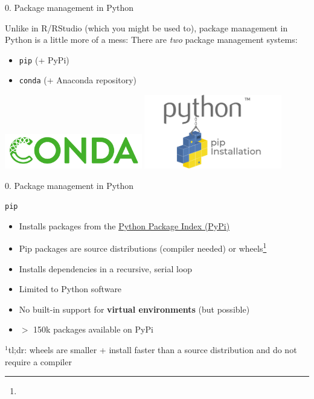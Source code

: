 \begin{vbframe}{0. Package management in Python}

\vfill

Unlike in R/RStudio (which you might be used to), package management in Python is a little more of a mess:  
There are \textit{two} package management systems:

\begin{itemize}
		\item \texttt{pip} (+ PyPi)
		\item \texttt{conda} (+ Anaconda repository)
\end{itemize}

\centering
\includegraphics[width=0.45\textwidth]{figure/conda.png}
\includegraphics[width=0.45\textwidth]{figure/pip.png}  

\vfill

\end{vbframe}


\begin{vbframe}{0. Package management in Python}
\vfill

\texttt{pip}
			
\begin{itemize}
		\item Installs packages from the \href{https://pypi.org/}{Python Package Index (PyPi)}
		\item Pip packages are source distributions (compiler needed) or wheels\footnote{}
		\item Installs dependencies in a recursive, serial loop
		\item Limited to Python software
		\item No built-in support for \textbf{virtual environments} (but possible)
		\item $>$ 150k packages available on PyPi
\end{itemize}

\vfill

\footnotesize $^1$tl;dr: wheels are smaller + install faster than a source distribution and do not require a compiler

\end{vbframe}

